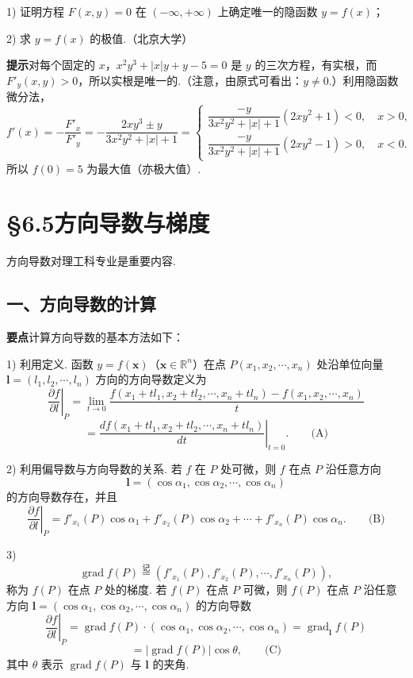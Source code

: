 \documentclass[UTF8, 12pt, fontset=fandol, oneside]{ctexart}
\begin{document}
1) 证明方程 $F(x,y)=0$ 在 $(-\infty,+\infty)$ 上确定唯一的隐函数 $y=f(x)$；

2) 求 $y=f(x)$ 的极值.（北京大学）

\noindent\textbf{提示}\quad 对每个固定的 $x$，$x^2y^3+|x|y+y-5=0$ 是 $y$ 的三次方程，有实根，而 $F'_y(x,y)>0$，所以实根是唯一的.（注意，由原式可看出：$y\ne0$.）利用隐函数微分法，
\[
  f'(x)=-\frac{F'_x}{F'_y}
  =
  -\frac{2xy^3\pm y}{3x^2y^2+|x|+1}
  =
  \begin{cases}
    \dfrac{-y}{3x^2y^2+|x|+1}(2xy^2+1)<0,\quad x>0,\\[6pt]
    \dfrac{-y}{3x^2y^2+|x|+1}(2xy^2-1)>0,\quad x<0.
  \end{cases}
\]
所以 $f(0)=5$ 为最大值（亦极大值）.

\section*{§6.5\quad 方向导数与梯度}

方向导数对理工科专业是重要内容.

\subsection*{一、方向导数的计算}

\noindent\textbf{要点}\quad 计算方向导数的基本方法如下：

1) 利用定义. 函数 $y=f(\mathbf x)$（$\mathbf x\in\mathbb R^n$）在点
$P(x_1,x_2,\cdots,x_n)$ 处沿单位向量
$\mathbf l=(l_1,l_2,\cdots,l_n)$ 方向的方向导数定义为
\[
\left.\frac{\partial f}{\partial l}\right|_P
=\lim_{t\to0}
\frac{f(x_1+tl_1,x_2+tl_2,\cdots,x_n+tl_n)-f(x_1,x_2,\cdots,x_n)}{t}
\]
\[
=
\left.
\frac{d f(x_1+tl_1,x_2+tl_2,\cdots,x_n+tl_n)}{dt}
\right|_{t=0}. \qquad\text{(A)}
\]

2) 利用偏导数与方向导数的关系. 若 $f$ 在 $P$ 处可微，则 $f$ 在点 $P$ 沿任意方向
\[
  \mathbf l=(\cos\alpha_1,\cos\alpha_2,\cdots,\cos\alpha_n)
\]
的方向导数存在，并且
\[
\left.\frac{\partial f}{\partial l}\right|_P
=f'_{x_1}(P)\cos\alpha_1+f'_{x_2}(P)\cos\alpha_2+\cdots+f'_{x_n}(P)\cos\alpha_n. \qquad\text{(B)}
\]

3)
\[
  \operatorname{grad} f(P)\overset{\text{记}}{=}
  (f'_{x_1}(P),f'_{x_2}(P),\cdots,f'_{x_n}(P)),
\]
称为 $f(P)$ 在点 $P$ 处的梯度. 若 $f(P)$ 在点 $P$ 可微，则 $f(P)$ 在点 $P$ 沿任意方向
$\mathbf l=(\cos\alpha_1,\cos\alpha_2,\cdots,\cos\alpha_n)$ 的方向导数
\[
\left.\frac{\partial f}{\partial l}\right|_P
=\operatorname{grad} f(P)\cdot(\cos\alpha_1,\cos\alpha_2,\cdots,\cos\alpha_n)
=\operatorname{grad}_{\mathbf l}f(P)
\]
\[
  =|\operatorname{grad} f(P)|\cos\theta, \qquad\text{(C)}
\]
其中 $\theta$ 表示 $\operatorname{grad}f(P)$ 与 $\mathbf l$ 的夹角.
\end{document}
